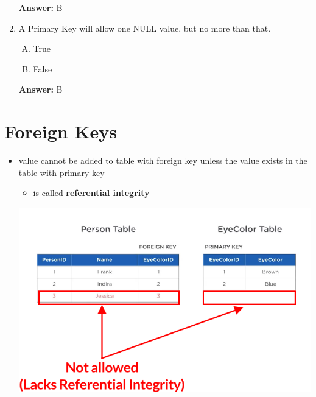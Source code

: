 \documentclass[12pt]{article}
\begin{document}
\begin{enumerate}[1.]
    \bigskip

    \textbf{Answer:} B

    \item

    A Primary Key will allow one NULL value, but no more than that.

    \bigskip

    \begin{enumerate}[A.]
        \item True
        \item False
    \end{enumerate}

    \bigskip

    \textbf{Answer:} B

\end{enumerate}

\bigskip

\section{Foreign Keys}

\bigskip

\begin{itemize}
    \item value cannot be added to table with foreign key unless the value exists
    in the table with primary key
    \begin{itemize}
        \item is called \textbf{referential integrity}
    \end{itemize}

    \bigskip

    \begin{center}
    \includegraphics[width=0.8\linewidth]{images/part_2_notes_2.png}
    \end{center}
\end{itemize}
\end{document}
